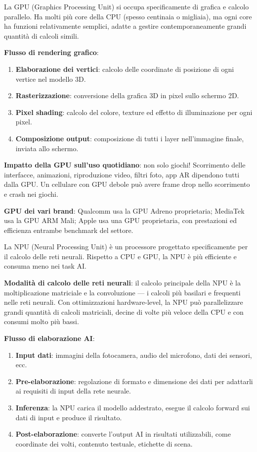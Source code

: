 La GPU (Graphics Processing Unit) si occupa specificamente di grafica e calcolo parallelo. Ha molti più core della CPU (spesso centinaia o migliaia), ma ogni core ha funzioni relativamente semplici, adatte a gestire contemporaneamente grandi quantità di calcoli simili.

\textbf{Flusso di rendering grafico}:

\begin{enumerate}
  \item \textbf{Elaborazione dei vertici}: calcolo delle coordinate di posizione di ogni vertice nel modello 3D.
  \item \textbf{Rasterizzazione}: conversione della grafica 3D in pixel sullo schermo 2D.
  \item \textbf{Pixel shading}: calcolo del colore, texture ed effetto di illuminazione per ogni pixel.
  \item \textbf{Composizione output}: composizione di tutti i layer nell'immagine finale, inviata allo schermo.
\end{enumerate}

\textbf{Impatto della GPU sull'uso quotidiano}: non solo giochi! Scorrimento delle interfacce, animazioni, riproduzione video, filtri foto, app AR dipendono tutti dalla GPU. Un cellulare con GPU debole può avere frame drop nello scorrimento e crash nei giochi.

\textbf{GPU dei vari brand}: Qualcomm usa la GPU Adreno proprietaria; MediaTek usa la GPU ARM Mali; Apple usa una GPU proprietaria, con prestazioni ed efficienza entrambe benchmark del settore.


La NPU (Neural Processing Unit) è un processore progettato specificamente per il calcolo delle reti neurali. Rispetto a CPU e GPU, la NPU è più efficiente e consuma meno nei task AI.

\textbf{Modalità di calcolo delle reti neurali}: il calcolo principale della NPU è la moltiplicazione matriciale e la convoluzione — i calcoli più basilari e frequenti nelle reti neurali. Con ottimizzazioni hardware-level, la NPU può parallelizzare grandi quantità di calcoli matriciali, decine di volte più veloce della CPU e con consumi molto più bassi.

\textbf{Flusso di elaborazione AI}:

\begin{enumerate}
  \item \textbf{Input dati}: immagini della fotocamera, audio del microfono, dati dei sensori, ecc.
  \item \textbf{Pre-elaborazione}: regolazione di formato e dimensione dei dati per adattarli ai requisiti di input della rete neurale.
  \item \textbf{Inferenza}: la NPU carica il modello addestrato, esegue il calcolo forward sui dati di input e produce il risultato.
  \item \textbf{Post-elaborazione}: converte l'output AI in risultati utilizzabili, come coordinate dei volti, contenuto testuale, etichette di scena.
\end{enumerate}

